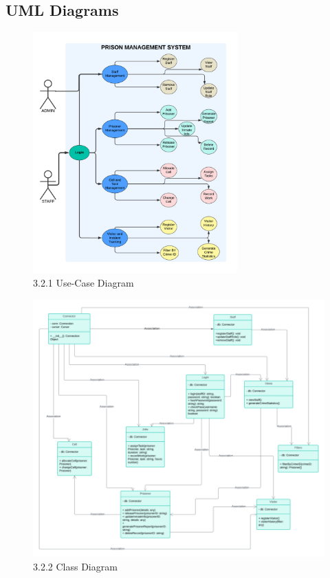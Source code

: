 \documentclass[aspectratio=169]{beamer}
\begin{document}
\subsection{UML Diagrams}
\begin{frame}{}
    \begin{figure}
        \centering
        \includegraphics[width=0.7\textwidth,height=0.85\textheight]{usecase.png}
        \caption{3.2.1 Use-Case Diagram}
        \label{fig:use-case}
    \end{figure}
\end{frame}
\begin{frame}{} %
    \begin{figure}
        \centering
        \includegraphics[width=0.5\linewidth]{class3comp.png}
        \caption{3.2.2 Class Diagram}
        \label{fig:class}
    \end{figure}
\end{frame}
\end{document}
